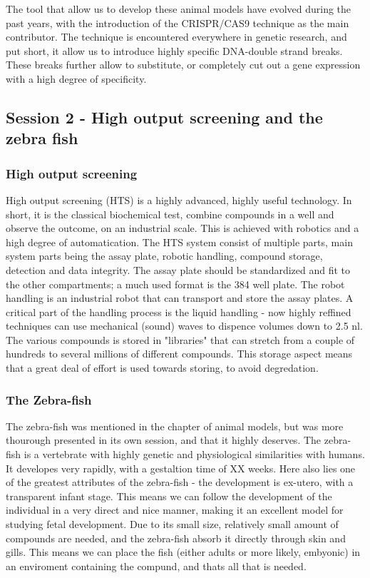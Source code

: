 \documentclass[12p]{article}
\begin{document}
The tool that allow us to develop these animal models have evolved during the past years, with the introduction of the CRISPR/CAS9 technique as the main contributor.
The technique is encountered everywhere in genetic research, and put short, it allow us to introduce highly specific DNA-double strand breaks.
These breaks further allow to substitute, or completely cut out a gene expression with a high degree of specificity.

\subsection*{Session 2 - High output screening and the zebra fish}

\subsubsection*{High output screening}

High output screening (HTS) is a highly advanced, highly useful technology. 
In short, it is the classical biochemical test, combine compounds in a well and observe the outcome, on an industrial scale.
This is achieved with robotics and a high degree of automatication.
The HTS system consist of multiple parts, main system parts being the assay plate, robotic handling, compound storage, detection and data integrity.
The assay plate should be standardized and fit to the other compartments; a much used format is the 384 well plate.
The robot handling is an industrial robot that can transport and store the assay plates. 
A critical part of the handling process is the liquid handling - now highly reffined techniques can use mechanical (sound) waves to dispence volumes down to 2.5 nl.
The various compounds is stored in "libraries" that can stretch from a couple of hundreds to several millions of different compounds.
This storage aspect means that a great deal of effort is used towards storing, to avoid degredation.

\subsubsection*{The Zebra-fish}

The zebra-fish was mentioned in the chapter of animal models, but was more thourough presented in its own session, and that it highly deserves.
The zebra-fish is a vertebrate with highly genetic and physiological similarities with humans.
It developes very rapidly, with a gestaltion time of XX weeks.
Here also lies one of the greatest attributes of the zebra-fish - the development is ex-utero, with a transparent infant stage.
This means we can follow the development of the individual in a very direct and nice manner, making it an excellent model for studying fetal development.
Due to its small size, relatively small amount of compounds are needed, and the zebra-fish absorb it directly through skin and gills.
This means we can place the fish (either adults or more likely, embyonic) in an enviroment containing the compund, and thats all that is needed.
\end{document}

